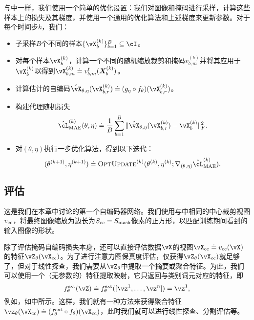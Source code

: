 \documentclass[../../book-main_zh.tex]{subfiles}
\begin{document}
与中一样，我们使用一个简单的优化设置：我们对图像和掩码进行采样，计算这些样本上的损失及其梯度，并使用一个通用的优化算法和上述梯度来更新参数。对于每个时间步\(k\)，我们：
\begin{itemize}
    \item 子采样\(B\)个不同的样本\(\{\vX_{b}^{(k)}\}_{b = 1}^{B} \subseteq \cI\)。
    \item 对每个样本\(\vX_{b}^{(k)}\)，计算一个不同的随机缩放裁剪和掩码\(v_{b, m}^{(k)}\)并将其应用于\(\vX_{b}^{(k)}\)以得到\(\vX_{b, m}^{(k)} \doteq v_{b, m}^{t}(\X_{b}^{(k)})\)。
    \item 计算估计的自编码\(\hat{\vX}_{\theta, \eta}(\vX_{b, r}^{(k)}) \doteq (g_{\eta} \circ f_{\theta})(\vX_{b, r}^{(k)})\)。
    \item 构建代理随机损失
    \begin{equation}
        \hat{\cL}_{\mathrm{MAE}}^{(k)}(\theta, \eta) \doteq \frac{1}{B}\sum_{b = 1}^{B}\norm{\hat{\vX}_{\theta, \eta}(\vX_{b, r}^{(k)}) - \vX_{b}^{(k)}}_{F}^{2}.
    \end{equation}
    \item 对\((\theta, \eta)\)执行一步优化算法，得到以下迭代：
    \begin{equation}
        (\theta^{(k + 1)}, \eta^{(k + 1)}) \doteq \textsc{OptUpdate}^{(k)}(\theta^{(k)}, \eta^{(k)}; \nabla_{(\theta, \eta)}\hat{\cL}_{\mathrm{MAE}}^{(k)}).
    \end{equation}
\end{itemize}

\subsection{评估} \label{sub:image_completion_optimization_1}

这是我们在本章中讨论的第一个自编码器网络。我们使用与中相同的中心裁剪视图\(v_{\mathrm{cc}}\)，将最终图像缩放为边长为\(S_{\mathrm{cc}} = S_{\mathrm{mask}}\)像素的正方形，以匹配训练期间看到的输入图像的形状。

除了评估掩码自编码损失本身，还可以直接评估数据\(\vX\)的视图\(\vX_{\cc} \doteq v_{\cc}(\vX)\)的特征\(\vZ_{\theta}(\vX_{\cc})\)。为了进行注意力图保真度评估，仅获得\(\vZ_{\theta}(\vX_{\cc})\)就足够了，但对于线性探查，我们需要从\(\vZ_{\theta}\)中提取一个摘要或聚合特征。为此，我们可以使用一个（无参数的）特征提取映射，它只返回与类别词元对应的特征，即
\begin{equation}
    f_{\theta}^{\ext}(\vZ) \doteq f_{\theta}^{\ext}([\vz^{1}, \dots, \vz^{n}]) = \vz^{1},
\end{equation}
例如，如中所示。这样，我们就有一种方法来获得聚合特征\(\vz_{\theta}(\vX_{\cc}) \doteq (f_{\theta}^{\ext} \circ f_{\theta})(\vX_{\cc})\)，此时我们就可以进行线性探查、分割评估等。
\end{document}
